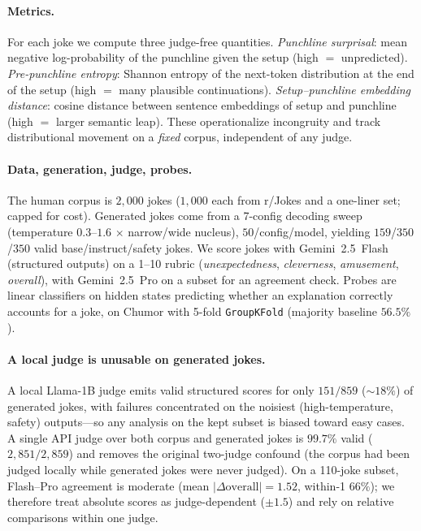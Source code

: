 \documentclass{article}
\begin{document}
\paragraph{Metrics.} For each joke we compute three judge-free quantities. \emph{Punchline surprisal}: mean negative log-probability of the punchline given the setup (high $=$ unpredicted). \emph{Pre-punchline entropy}: Shannon entropy of the next-token distribution at the end of the setup (high $=$ many plausible continuations). \emph{Setup--punchline embedding distance}: cosine distance between sentence embeddings of setup and punchline (high $=$ larger semantic leap). These operationalize incongruity and track distributional movement on a \emph{fixed} corpus, independent of any judge.

\paragraph{Data, generation, judge, probes.} The human corpus is $2{,}000$ jokes ($1{,}000$ each from r/Jokes \citep{weller2020rjokes} and a one-liner set; capped for cost). Generated jokes come from a 7-config decoding sweep (temperature $0.3$--$1.6$ $\times$ narrow/wide nucleus), $50$/config/model, yielding $159$/$350$/$350$ valid base/instruct/safety jokes. We score jokes with Gemini~2.5~Flash (structured outputs) on a 1--10 rubric (\emph{unexpectedness}, \emph{cleverness}, \emph{amusement}, \emph{overall}), with Gemini~2.5~Pro on a subset for an agreement check. Probes are linear classifiers on hidden states predicting whether an explanation correctly accounts for a joke, on Chumor \citep{he2024chumor} with 5-fold \texttt{GroupKFold} (majority baseline $56.5\%$).

\paragraph{A local judge is unusable on generated jokes.} A local Llama-1B judge emits valid structured scores for only $151/859$ ($\sim$$18\%$) of generated jokes, with failures concentrated on the noisiest (high-temperature, safety) outputs---so any analysis on the kept subset is biased toward easy cases. A single API judge over both corpus and generated jokes is $99.7\%$ valid ($2{,}851/2{,}859$) and removes the original two-judge confound (the corpus had been judged locally while generated jokes were never judged). On a 110-joke subset, Flash--Pro agreement is moderate (mean $|\Delta\text{overall}|=1.52$, within-1 $66\%$); we therefore treat absolute scores as judge-dependent ($\pm$$1.5$) and rely on relative comparisons within one judge.
\end{document}
